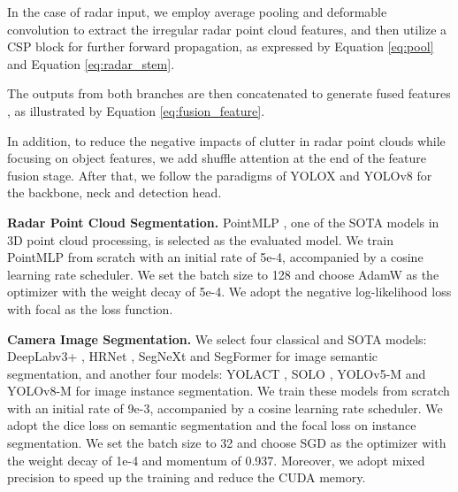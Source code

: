 \documentclass[lettersize,journal]{IEEEtran}
\begin{document}
In the case of radar input, we employ average pooling and deformable convolution \cite{zhu2020deformable} to extract the irregular radar point cloud features, and then utilize a CSP block for further forward propagation, as expressed by Equation \ref{eq:pool} and Equation \ref{eq:radar_stem}. 




The outputs from both branches are then concatenated to generate fused features , as illustrated by Equation \ref{eq:fusion_feature}. 


In addition, to reduce the negative impacts of clutter in radar point clouds while focusing on object features, we add shuffle attention \cite{zhang2021sa} at the end of the feature fusion stage. After that, we follow the paradigms of YOLOX and YOLOv8 for the backbone, neck and detection head.

\textbf{Radar Point Cloud Segmentation.} PointMLP \cite{ma2022rethinking}, one of the SOTA models in 3D point cloud processing, is selected as the evaluated model. We train PointMLP from scratch with an initial rate of 5e-4, accompanied by a cosine learning rate scheduler. We set the batch size to 128 and choose AdamW as the optimizer with the weight decay of 5e-4. We adopt the negative log-likelihood loss with focal \cite{lin2017focal} as the loss function. 


\textbf{Camera Image Segmentation.} We select four classical and SOTA models: DeepLabv3+ \cite{chen2018encoder}, HRNet \cite{wang2020deep}, SegNeXt \cite{guo2022segnext} and SegFormer \cite{xie2021segformer} for image semantic segmentation, and another four models: YOLACT \cite{bolya2019yolact}, SOLO \cite{wang2020solo}, YOLOv5-M \cite{yolov5} and YOLOv8-M \cite{yolov8} for image instance segmentation. We train these models from scratch with an initial rate of 9e-3, accompanied by a cosine learning rate scheduler. We adopt the dice loss on semantic segmentation and the focal loss on instance segmentation. We set the batch size to 32 and choose SGD as the optimizer with the weight decay of 1e-4 and momentum of 0.937. Moreover, we adopt mixed precision to speed up the training and reduce the CUDA memory.  
\end{document}
